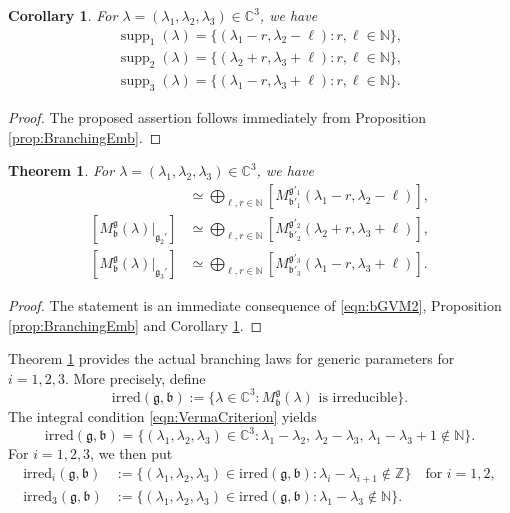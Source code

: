 \documentclass[a4paper,11pt,reqno]{amsart}
\newcommand{\frakg}{\mathfrak{g}}
\newcommand{\CC}{\mathbb{C}}
\newcommand{\0}{{\bf 0}}
\newcommand{\N}{\mathbb{N}}
\newcommand{\Z}{\mathbb{Z}}
\newcommand{\C}{\mathbb{C}}
\newcommand{\1}{{\bf 1}}
\newcommand{\frakb}{{\mathfrak b}}
\newcommand{\irred}{\mathrm{irred}}
\DeclareMathOperator{\supp}{supp}
\newcommand{\Mb}{M^{\frakg}_{\frakb}}
\theoremstyle{plain}
\newtheorem{theorem}[equation]{Theorem}
\newtheorem{corollary}[equation]{Corollary}
\theoremstyle{definition}
\numberwithin{equation}{section}
\theoremstyle{definition}
\begin{document}
\begin{corollary}\label{cor:support}
For $\lambda=(\lambda_1,\lambda_2,\lambda_3) \in \C^3$, we have 
\begin{align*}
\supp_1(\lambda)
=\{(\lambda_1-r, \lambda_2-\ell): r, \ell \in \N\},\\[3pt]
\supp_2(\lambda)
=\{(\lambda_2+r, \lambda_3+\ell): r, \ell \in \N\},\\[3pt]
\supp_3(\lambda)
=\{(\lambda_1-r, \lambda_3+\ell): r, \ell \in \N\}.
\end{align*}
\end{corollary}

\begin{proof}
The proposed assertion follows immediately from Proposition \ref{prop:BranchingEmb}.
\end{proof}

\begin{theorem}\label{thm:BranchingEmb}
For $\lambda=(\lambda_1, \lambda_2,\lambda_3) \in \CC^3$,
we have
\begin{align}
[\Mb(\lambda)\vert_{\frakg_1'}]
&\simeq 
\bigoplus_{\ell, r \in \N}
[M^{\frakg'_1}_{\frakb'_1}(\lambda_1-r, \lambda_2-\ell)],\label{eqn:bGVM_Emb1}\\[3pt]
[\Mb(\lambda)\vert_{\frakg_2'}]
&\simeq 
\bigoplus_{\ell, r \in \N}
[M^{\frakg'_2}_{\frakb'_2}(\lambda_2+r, \lambda_3+\ell)],\label{eqn:bGVM_Emb2}\\[3pt]
[\Mb(\lambda)\vert_{\frakg_3'}]
&\simeq 
\bigoplus_{\ell, r \in \N}
[M^{\frakg'_3}_{\frakb'_3}(\lambda_1-r, \lambda_3+\ell)].\label{eqn:bGVM_Emb3}
\end{align}
\end{theorem}

\begin{proof}
The statement is an immediate consequence 
of \eqref{eqn:bGVM2}, Proposition \ref{prop:BranchingEmb}
and Corollary \ref{cor:support}.
\end{proof}

Theorem \ref{thm:BranchingEmb} provides the actual branching laws
for generic parameters for $i=1,2,3$. More precisely,
define 
\begin{equation}\label{eqn:Irreducible_Parameters}
\irred(\frakg,\frakb):=\{\lambda \in \C^3: \text{$\Mb(\lambda)$ is irreducible}\}.
\end{equation}
The integral condition  \eqref{eqn:VermaCriterion} yields
\begin{equation}\label{eqn:Irreducible_Parameters2}
\irred(\frakg,\frakb)=\{(\lambda_1,\lambda_2, \lambda_3) \in \C^3:
\lambda_1-\lambda_2,\,
\lambda_2-\lambda_3,\, 
\lambda_1-\lambda_3+1 \notin \N\}.
\end{equation}
For $i=1,2,3$, we then put
\begin{align*}
\irred_{i}(\frakg,\frakb)
&:=\{(\lambda_1,\lambda_2, \lambda_3)\in \irred(\frakg,\frakb): 
\lambda_i -\lambda_{i+1}\notin \Z \}\quad \text{for $i=1,2$},\\[3pt]
\irred_{3}(\frakg,\frakb)
&:=\{(\lambda_1,\lambda_2, \lambda_3)\in \irred(\frakg,\frakb): 
\lambda_1-\lambda_3 \notin \N \}.
\end{align*}
\end{document}
